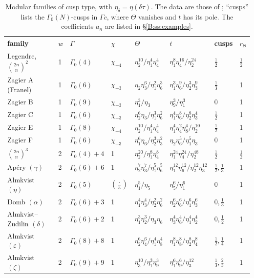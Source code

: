 \documentclass[11pt,a4paper]{article}
\theoremstyle{definition}\newtheorem{definition}[theorem]{Definition}
\theoremstyle{remark}\newtheorem{remark}[theorem]{Remark}
\numberwithin{equation}{section}
\begin{document}
\begin{table}[ht]
\centering\small
\renewcommand{\arraystretch}{1.25}
\begin{tabular}{@{}llllllll@{}}
\toprule
family & $w$ & $\Gamma$ & $\chi$ & $\Theta$ & $t$ & cusps & $r_\Theta$\\\midrule
Legendre, $\binom{2n}{n}^2$ & 1 & $\Gamma_0(4)$ & $\chi_{-4}$ & $\eta_2^{10}/\eta_1^4\eta_4^4$ &
  $\eta_1^8\eta_4^{16}/\eta_2^{24}$ & $\frac12$ & $\frac12$\\
Zagier A (Franel) & 1 & $\Gamma_0(6)$ & $\chi_{-3}$ & $\eta_2\eta_3^6/\eta_1^2\eta_6^3$ &
  $\eta_1^3\eta_6^9/\eta_2^3\eta_3^9$ & $\frac13$ & 1\\
Zagier B & 1 & $\Gamma_0(9)$ & $\chi_{-3}$ & $\eta_1^3/\eta_3$ & $\eta_9^3/\eta_1^3$ & $0$ & 1\\
Zagier C & 1 & $\Gamma_0(6)$ & $\chi_{-3}$ & $\eta_2^6\eta_3/\eta_1^3\eta_6^2$ &
  $\eta_1^4\eta_6^8/\eta_2^8\eta_3^4$ & $\frac12$ & 1\\
Zagier E & 1 & $\Gamma_0(8)$ & $\chi_{-4}$ & $\eta_2^{10}/\eta_1^4\eta_4^4$ &
  $\eta_1^4\eta_4^2\eta_8^4/\eta_2^{10}$ & $\frac12$ & 1\\
Zagier F & 1 & $\Gamma_0(6)$ & $\chi_{-3}$ & $\eta_1^6\eta_6/\eta_2^3\eta_3^2$ &
  $\eta_2\eta_6^5/\eta_1^5\eta_3$ & $0$ & 1\\\midrule
$\binom{2n}n^3$ & 2 & $\Gamma_0(4)+4$ & 1 & $\eta_2^{20}/\eta_1^8\eta_4^8$ &
  $\eta_1^{24}\eta_4^{24}/\eta_2^{48}$ & $\frac12$ & $\frac12$\\
Ap\'ery $(\gamma)$ & 2 & $\Gamma_0(6)+6$ & 1 & $\eta_2^7\eta_3^7/\eta_1^5\eta_6^5$ &
  $\eta_1^{12}\eta_6^{12}/\eta_2^{12}\eta_3^{12}$ & $\frac12,\frac13$ & 1\\
Almkvist $(\eta)$ & 2 & $\Gamma_0(5)$ & $(\frac{\cdot}{5})$ & $\eta_1^5/\eta_5$ &
  $\eta_5^6/\eta_1^6$ & $0$ & 1\\
Domb $(\alpha)$ & 2 & $\Gamma_0(6)+3$ & 1 & $\eta_1^4\eta_3^4/\eta_2^2\eta_6^2$ &
  $\eta_2^6\eta_6^6/\eta_1^6\eta_3^6$ & $0,\frac13$ & 1\\
Almkvist--Zudilin $(\delta)$ & 2 & $\Gamma_0(6)+2$ & 1 & $\eta_1^3\eta_2^3/\eta_3\eta_6$ &
  $\eta_3^4\eta_6^4/\eta_1^4\eta_2^4$ & $0,\frac12$ & 1\\
Almkvist $(\varepsilon)$ & 2 & $\Gamma_0(8)+8$ & 1 & $\eta_2^6\eta_4^6/\eta_1^4\eta_8^4$ &
  $\eta_1^8\eta_8^8/\eta_2^8\eta_4^8$ & $\frac12,\frac14$ & 1\\
Almkvist $(\zeta)$ & 2 & $\Gamma_0(9)+9$ & 1 & $\eta_3^{10}/\eta_1^3\eta_9^3$ &
  $\eta_1^6\eta_9^6/\eta_3^{12}$ & $\frac13,\frac23$ & 1\\\bottomrule
\end{tabular}
\caption{Modular families of cusp type, with $\eta_\delta=\eta(\delta\tau)$. The data are those of
\cite[App.~B, C]{Beu26}; ``cusps'' lists the $\Gamma_0(N)$-cusps in $\Gamma c$, where $\Theta$
vanishes and $t$ has its pole. The coefficients $a_n$ are listed in \S\ref{B:ss:examples}.}
\label{B:tab:fam}
\end{table}
\end{document}
